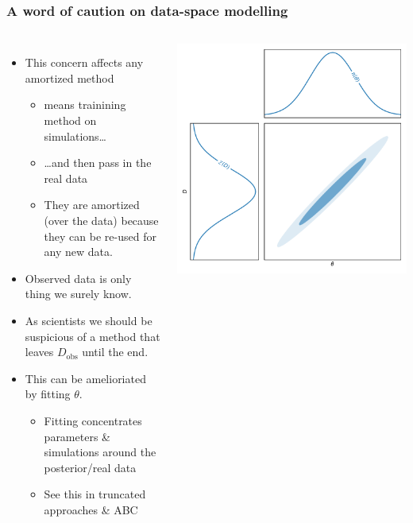 \documentclass[aspectratio=169]{beamer}
\begin{document}
\begin{frame}
    \frametitle{A word of caution on data-space modelling}
            \begin{columns}
    \begin{itemize}
        \item This concern affects any amortized method 
            \begin{itemize}
                \item means trainining method on simulations\ldots
                \item \ldots and then pass in the real data
                \item They are amortized (over the data) because they can be re-used for any new data.
            \end{itemize}
        \item Observed data is only thing we surely know.
        \item As scientists we should be suspicious of a method that leaves $D_\mathrm{obs}$ until the end.
        \item This can be amelioriated by fitting $\theta$.
            \begin{itemize}
                \item Fitting concentrates parameters \& simulations around the posterior/real data
                \item See this in truncated approaches \& ABC
            \end{itemize}
    \end{itemize}
                \includegraphics[page=6, width=\textwidth]{figures/sbi_parameter_estimation.pdf}%
            \end{columns}

\end{frame}
\end{document}
